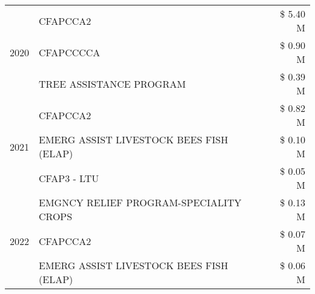 \begin{tabular}{llr}
\cline{1-3}
\multirow[t]{3}{*}{2020} & CFAPCCA2 & \$ 5.40 M \\
 & CFAPCCCCA & \$ 0.90 M \\
 & TREE ASSISTANCE PROGRAM & \$ 0.39 M \\
\cline{1-3}
\multirow[t]{3}{*}{2021} & CFAPCCA2 & \$ 0.82 M \\
 & EMERG ASSIST LIVESTOCK BEES FISH (ELAP) & \$ 0.10 M \\
 & CFAP3 - LTU & \$ 0.05 M \\
\cline{1-3}
\multirow[t]{3}{*}{2022} & EMGNCY RELIEF PROGRAM-SPECIALITY CROPS & \$ 0.13 M \\
 & CFAPCCA2 & \$ 0.07 M \\
 & EMERG ASSIST LIVESTOCK BEES FISH (ELAP) & \$ 0.06 M \\
\cline{1-3}
\bottomrule
\end{tabular}
